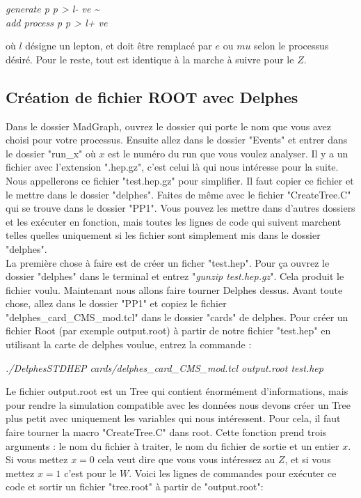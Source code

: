 \documentclass[a4paper]{report}
\begin{document}
\w
\begin{flushleft}
\textit{generate p p > l- ve \textasciitilde} \\
\textit{add process p p > l+ ve} \\
\end{flushleft}

où $l$ désigne un lepton, et doit être remplacé par $e$ ou $mu$ selon le processus désiré. Pour le reste, tout est identique à la marche à suivre pour le $Z$.



\subsection{Création de fichier ROOT avec Delphes}

Dans le dossier MadGraph, ouvrez le dossier qui porte le nom que vous avez choisi pour votre processus. Ensuite allez dans le dossier "Events" et entrer dans le dossier "run\_x" où $x$ est le numéro du run que vous voulez analyser. Il y a un fichier avec l'extension ".hep.gz", c'est celui là qui nous intéresse pour la suite. Nous appellerons ce fichier "test.hep.gz" pour simplifier. Il faut copier ce fichier et le mettre dans le dossier "delphes". Faites de même avec le fichier "CreateTree.C" qui se trouve dans le dossier "PP1". Vous pouvez les mettre dans d'autres dossiers et les exécuter en fonction, mais toutes les lignes de code qui suivent marchent telles quelles uniquement si les fichier sont simplement mis dans le dossier "delphes".  \\

La première chose à faire est de créer un ficher "test.hep". Pour ça ouvrez le dossier "delphes" dans le terminal et entrez "\textit{gunzip test.hep.gz}". Cela produit le fichier voulu. Maintenant nous allons faire tourner Delphes dessus. Avant toute chose, allez dans le dossier "PP1" et copiez le fichier "delphes\_card\_CMS\_mod.tcl" dans le dossier "cards" de delphes. Pour créer un fichier Root (par exemple output.root) à partir de notre fichier "test.hep" en utilisant la carte de delphes voulue, entrez la commande : \w

\begin{flushleft}
\textit{./DelphesSTDHEP cards/delphes\_card\_CMS\_mod.tcl output.root test.hep }
\end{flushleft}  

Le fichier output.root est un Tree qui contient énormément d'informations, mais pour rendre la simulation compatible avec les données nous devons créer un Tree plus petit avec uniquement les variables qui nous intéressent. Pour cela, il faut faire tourner la macro "CreateTree.C" dans root. Cette fonction prend trois arguments : le nom du fichier à traiter, le nom du fichier de sortie et un entier $x$. Si vous mettez $x=0$ cela veut dire que vous vous intéressez au $Z$, et si vous mettez $x=1$ c'est pour le $W$. Voici les lignes de commandes pour exécuter ce code et sortir un fichier "tree.root" à partir de "output.root":
\w
\end{document}
